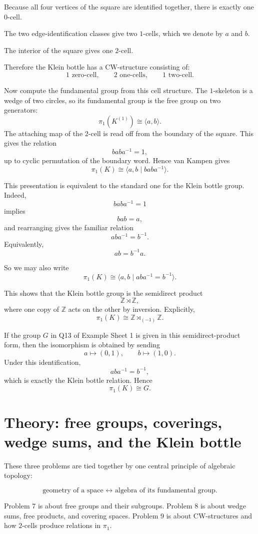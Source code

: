 \documentclass[12pt,a4paper]{article}
\theoremstyle{notespace}
\begin{document}
Because all four vertices of the square are identified together, there is exactly one \(0\)-cell.

The two edge-identification classes give two \(1\)-cells, which we denote by \(a\) and \(b\).

The interior of the square gives one \(2\)-cell.

Therefore the Klein bottle has a CW-structure consisting of:
\[
1 \text{ zero-cell},\qquad 2 \text{ one-cells},\qquad 1 \text{ two-cell}.
\]

Now compute the fundamental group from this cell structure. The \(1\)-skeleton is a wedge of two circles, so its fundamental group is the free group on two generators:
\[
\pi_1(K^{(1)})\cong \langle a,b\rangle.
\]
The attaching map of the \(2\)-cell is read off from the boundary of the square. This gives the relation
\[
baba^{-1}=1,
\]
up to cyclic permutation of the boundary word. Hence van Kampen gives
\[
\pi_1(K)\cong \langle a,b \mid baba^{-1}\rangle.
\]

This presentation is equivalent to the standard one for the Klein bottle group. Indeed,
\[
baba^{-1}=1
\]
implies
\[
bab=a,
\]
and rearranging gives the familiar relation
\[
aba^{-1}=b^{-1}.
\]
Equivalently,
\[
ab=b^{-1}a.
\]

So we may also write
\[
\pi_1(K)\cong \langle a,b \mid aba^{-1}=b^{-1}\rangle.
\]

This shows that the Klein bottle group is the semidirect product
\[
\mathbb Z \rtimes \mathbb Z,
\]
where one copy of \(\mathbb Z\) acts on the other by inversion. Explicitly,
\[
\pi_1(K)\cong \mathbb Z \rtimes_{(-1)} \mathbb Z.
\]

If the group \(G\) in Q13 of Example Sheet 1 is given in this semidirect-product form, then the isomorphism is obtained by sending
\[
a\mapsto (0,1),\qquad b\mapsto (1,0).
\]
Under this identification,
\[
aba^{-1}=b^{-1},
\]
which is exactly the Klein bottle relation. Hence
\[
\pi_1(K)\cong G.
\]


\section{Theory: free groups, coverings, wedge sums, and the Klein bottle}

These three problems are tied together by one central principle of algebraic topology:

\[
\text{geometry of a space } \longleftrightarrow \text{ algebra of its fundamental group.}
\]

Problem 7 is about free groups and their subgroups.  
Problem 8 is about wedge sums, free products, and covering spaces.  
Problem 9 is about CW-structures and how \(2\)-cells produce relations in \(\pi_1\).
\end{document}

